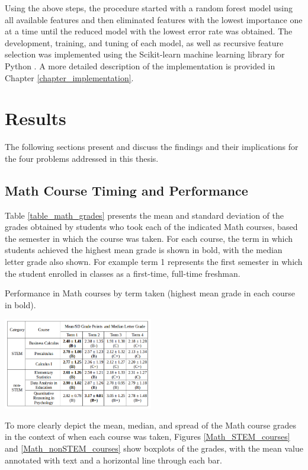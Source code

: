 Using the above steps, the procedure started with a random forest model using all available features and then eliminated features with the lowest importance one at a time until the reduced model with the lowest error rate was obtained.  The development, training, and tuning of each model, as well as recursive feature selection was implemented using the Scikit-learn machine learning library for Python \cite{scikitlearn}.  A more detailed description of the implementation is provided in Chapter \ref{chapter_implementation}.


\chapter{Results}

The following sections present and discuss the findings and their implications for the four problems addressed in this thesis.  

\section{Math Course Timing and Performance}

Table \ref{table_math_grades} presents the mean and standard deviation of the grades obtained by students who took each of the indicated Math courses, based the semester in which the course was taken.  For each course, the term in which students achieved the highest mean grade is shown in bold, with the median letter grade also shown.  For example term 1 represents the first semester in which the student enrolled in classes as a first-time, full-time freshman. 

\begin{table}[htbp]
\centering
\caption{Performance in Math courses by term taken (highest mean grade in each course in bold).}
\includegraphics[width=0.49\textwidth]{tables/table_math_grades.png}
\label{table_math_grades}
\end{table}

To more clearly depict the mean, median, and spread of the Math course grades in the context of when each course was taken, Figures \ref{Math_STEM_courses} and \ref{Math_nonSTEM_courses} show boxplots of the grades, with the mean value annotated with text and a horizontal line through each bar.  

